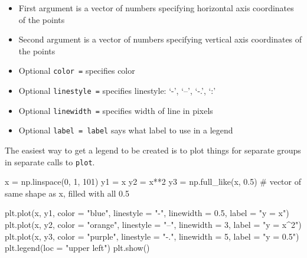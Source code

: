 \documentclass[]{extarticle}
\newenvironment{Shaded}{\begin{snugshade}}{\end{snugshade}}
\newcommand{\CommentTok}[1]{\textcolor[rgb]{0.50,0.62,0.50}{#1}}
\newcommand{\DecValTok}[1]{\textcolor[rgb]{0.86,0.86,0.80}{#1}}
\newcommand{\FloatTok}[1]{\textcolor[rgb]{0.75,0.75,0.82}{#1}}
\newcommand{\NormalTok}[1]{\textcolor[rgb]{0.80,0.80,0.80}{#1}}
\newcommand{\OperatorTok}[1]{\textcolor[rgb]{0.94,0.94,0.82}{#1}}
\newcommand{\StringTok}[1]{\textcolor[rgb]{0.80,0.58,0.58}{#1}}
\providecommand{\tightlist}{%
  \setlength{\itemsep}{0pt}\setlength{\parskip}{0pt}}
\begin{document}
\begin{itemize}
\tightlist
\item
  First argument is a vector of numbers specifying horizontal axis
  coordinates of the points
\item
  Second argument is a vector of numbers specifying vertical axis
  coordinates of the points
\item
  Optional \texttt{color\ =} specifies color
\item
  Optional \texttt{linestyle\ =} specifies linestyle: `-', `--', `-.',
  `:'
\item
  Optional \texttt{linewidth\ =} specifies width of line in pixels
\item
  Optional \texttt{label\ =\ \textquotesingle{}label\textquotesingle{}}
  says what label to use in a legend
\end{itemize}

The easiest way to get a legend to be created is to plot things for
separate groups in separate calls to \texttt{plot}.

\begin{Shaded}
\begin{Highlighting}[]
\NormalTok{x }\OperatorTok{=}\NormalTok{ np.linspace(}\DecValTok{0}\NormalTok{, }\DecValTok{1}\NormalTok{, }\DecValTok{101}\NormalTok{)}
\NormalTok{y1 }\OperatorTok{=}\NormalTok{ x}
\NormalTok{y2 }\OperatorTok{=}\NormalTok{ x}\OperatorTok{**}\DecValTok{2}
\NormalTok{y3 }\OperatorTok{=}\NormalTok{ np.full_like(x, }\FloatTok{0.5}\NormalTok{) }\CommentTok{# vector of same shape as x, filled with all 0.5}

\NormalTok{plt.plot(x, y1, color }\OperatorTok{=} \StringTok{"blue"}\NormalTok{, linestyle }\OperatorTok{=} \StringTok{"-"}\NormalTok{, linewidth }\OperatorTok{=} \FloatTok{0.5}\NormalTok{, label }\OperatorTok{=} \StringTok{"y = x"}\NormalTok{)}
\NormalTok{plt.plot(x, y2, color }\OperatorTok{=} \StringTok{"orange"}\NormalTok{, linestyle }\OperatorTok{=} \StringTok{"--"}\NormalTok{, linewidth }\OperatorTok{=} \DecValTok{3}\NormalTok{, label }\OperatorTok{=} \StringTok{"y = x^2"}\NormalTok{)}
\NormalTok{plt.plot(x, y3, color }\OperatorTok{=} \StringTok{"purple"}\NormalTok{, linestyle }\OperatorTok{=} \StringTok{"-."}\NormalTok{, linewidth }\OperatorTok{=} \DecValTok{5}\NormalTok{, label }\OperatorTok{=} \StringTok{"y = 0.5"}\NormalTok{)}
\NormalTok{plt.legend(loc }\OperatorTok{=} \StringTok{"upper left"}\NormalTok{)}
\NormalTok{plt.show()}
\end{Highlighting}
\end{Shaded}
\end{document}
